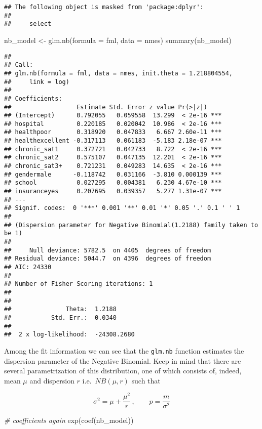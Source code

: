 \documentclass[
  oneside]{book}
\newenvironment{Shaded}{\begin{snugshade}}{\end{snugshade}}
\newcommand{\AttributeTok}[1]{\textcolor[rgb]{0.77,0.63,0.00}{#1}}
\newcommand{\CommentTok}[1]{\textcolor[rgb]{0.56,0.35,0.01}{\textit{#1}}}
\newcommand{\FunctionTok}[1]{\textcolor[rgb]{0.00,0.00,0.00}{#1}}
\newcommand{\NormalTok}[1]{#1}
\newcommand{\OtherTok}[1]{\textcolor[rgb]{0.56,0.35,0.01}{#1}}
\begin{document}
\begin{verbatim}
## The following object is masked from 'package:dplyr':
## 
##     select
\end{verbatim}

\begin{Shaded}
\begin{Highlighting}[]
\NormalTok{nb\_model }\OtherTok{\textless{}{-}} \FunctionTok{glm.nb}\NormalTok{(}\AttributeTok{formula =}\NormalTok{ fml, }\AttributeTok{data =}\NormalTok{ nmes)}
\FunctionTok{summary}\NormalTok{(nb\_model)}
\end{Highlighting}
\end{Shaded}

\begin{verbatim}
## 
## Call:
## glm.nb(formula = fml, data = nmes, init.theta = 1.218804554, 
##     link = log)
## 
## Coefficients:
##                  Estimate Std. Error z value Pr(>|z|)    
## (Intercept)      0.792055   0.059558  13.299  < 2e-16 ***
## hospital         0.220185   0.020042  10.986  < 2e-16 ***
## healthpoor       0.318920   0.047833   6.667 2.60e-11 ***
## healthexcellent -0.317113   0.061183  -5.183 2.18e-07 ***
## chronic_sat1     0.372721   0.042733   8.722  < 2e-16 ***
## chronic_sat2     0.575107   0.047135  12.201  < 2e-16 ***
## chronic_sat3+    0.721231   0.049283  14.635  < 2e-16 ***
## gendermale      -0.118742   0.031166  -3.810 0.000139 ***
## school           0.027295   0.004381   6.230 4.67e-10 ***
## insuranceyes     0.207695   0.039357   5.277 1.31e-07 ***
## ---
## Signif. codes:  0 '***' 0.001 '**' 0.01 '*' 0.05 '.' 0.1 ' ' 1
## 
## (Dispersion parameter for Negative Binomial(1.2188) family taken to be 1)
## 
##     Null deviance: 5782.5  on 4405  degrees of freedom
## Residual deviance: 5044.7  on 4396  degrees of freedom
## AIC: 24330
## 
## Number of Fisher Scoring iterations: 1
## 
## 
##               Theta:  1.2188 
##           Std. Err.:  0.0340 
## 
##  2 x log-likelihood:  -24308.2680
\end{verbatim}

Among the fit information we can see that the \texttt{glm.nb} function estimates
the dispersion parameter of the Negative Binomial. Keep in mind that there are
several parametrization of this distribution, one of which consists of, indeed,
mean \(\mu\) and dispersion \(r\) i.e.~\(NB(\mu, r)\) such that

\[
\sigma^2 = \mu + \frac{\mu^2}{r}\,,\qquad p = \frac{m}{\sigma^2}
\]

\begin{Shaded}
\begin{Highlighting}[]
\CommentTok{\# coefficients again}
\FunctionTok{exp}\NormalTok{(}\FunctionTok{coef}\NormalTok{(nb\_model))}
\end{Highlighting}
\end{Shaded}
\end{document}

